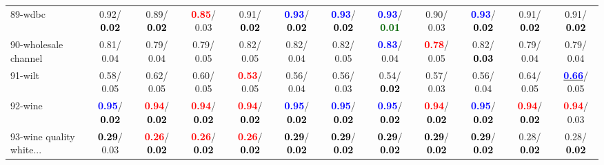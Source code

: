 \begin{table}[h]
\begin{center}
{\begin{tabular}{lc|c|c|c|c|c|c|c|c|c|c}
89-wdbc &   0.92/\textcolor{black}{\textbf{  0.02}} &   0.89/\textcolor{black}{\textbf{  0.02}} & \textcolor{red}{\textbf{  0.85}}/  0.03 &   0.91/\textcolor{black}{\textbf{  0.02}} & \textcolor{blue}{\textbf{  0.93}}/\textcolor{black}{\textbf{  0.02}} & \textcolor{blue}{\textbf{  0.93}}/\textcolor{black}{\textbf{  0.02}} & \textcolor{blue}{\textbf{  0.93}}/\textcolor{darkgreen}{\textbf{  0.01}} &   0.90/  0.03 & \textcolor{blue}{\textbf{  0.93}}/\textcolor{black}{\textbf{  0.02}} &   0.91/\textcolor{black}{\textbf{  0.02}} &   0.91/\textcolor{black}{\textbf{  0.02}} \\
90-wholesale channel &   0.81/  0.04 &   0.79/  0.04 &   0.79/  0.05 &   0.82/  0.05 &   0.82/  0.04 &   0.82/  0.05 & \textcolor{blue}{\textbf{  0.83}}/  0.04 & \textcolor{red}{\textbf{  0.78}}/  0.05 &   0.82/\textcolor{black}{\textbf{  0.03}} &   0.79/  0.04 &   0.79/  0.04 \\
91-wilt &   0.58/  0.05 &   0.62/  0.05 &   0.60/  0.05 & \textcolor{red}{\textbf{  0.53}}/  0.05 &   0.56/  0.04 &   0.56/  0.03 &   0.54/\textcolor{black}{\textbf{  0.02}} &   0.57/  0.03 &   0.56/  0.04 &   0.64/  0.05 & \underline{\textcolor{blue}{\textbf{  0.66}}}/  0.05 \\
92-wine & \textcolor{blue}{\textbf{  0.95}}/\textcolor{black}{\textbf{  0.02}} & \textcolor{red}{\textbf{  0.94}}/\textcolor{black}{\textbf{  0.02}} & \textcolor{red}{\textbf{  0.94}}/\textcolor{black}{\textbf{  0.02}} & \textcolor{red}{\textbf{  0.94}}/\textcolor{black}{\textbf{  0.02}} & \textcolor{blue}{\textbf{  0.95}}/\textcolor{black}{\textbf{  0.02}} & \textcolor{blue}{\textbf{  0.95}}/\textcolor{black}{\textbf{  0.02}} & \textcolor{blue}{\textbf{  0.95}}/\textcolor{black}{\textbf{  0.02}} & \textcolor{red}{\textbf{  0.94}}/\textcolor{black}{\textbf{  0.02}} & \textcolor{blue}{\textbf{  0.95}}/\textcolor{black}{\textbf{  0.02}} & \textcolor{red}{\textbf{  0.94}}/\textcolor{black}{\textbf{  0.02}} & \textcolor{red}{\textbf{  0.94}}/  0.03 \\ \hline
93-wine quality white... & \textcolor{black}{\textbf{  0.29}}/  0.03 & \textcolor{red}{\textbf{  0.26}}/\textcolor{black}{\textbf{  0.02}} & \textcolor{red}{\textbf{  0.26}}/\textcolor{black}{\textbf{  0.02}} & \textcolor{red}{\textbf{  0.26}}/\textcolor{black}{\textbf{  0.02}} & \textcolor{black}{\textbf{  0.29}}/\textcolor{black}{\textbf{  0.02}} & \textcolor{black}{\textbf{  0.29}}/\textcolor{black}{\textbf{  0.02}} & \textcolor{black}{\textbf{  0.29}}/\textcolor{black}{\textbf{  0.02}} & \textcolor{black}{\textbf{  0.29}}/\textcolor{black}{\textbf{  0.02}} & \textcolor{black}{\textbf{  0.29}}/\textcolor{black}{\textbf{  0.02}} &   0.28/\textcolor{black}{\textbf{  0.02}} &   0.28/\textcolor{black}{\textbf{  0.02}} \\

\end{tabular}}
\end{center}
\end{table}
